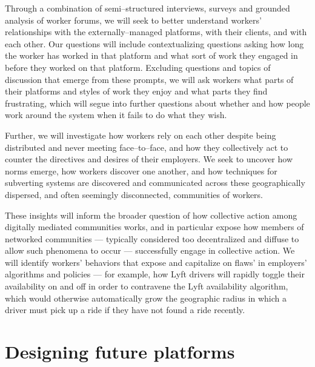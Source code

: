 \documentclass[11pt]{article}
\begin{document}
Through a combination of semi--structured interviews,
surveys and grounded analysis of worker forums,
we will seek to better understand workers' relationships with the externally--managed platforms,
with their clients,
and with each other.
Our questions will include contextualizing questions asking how long the worker has worked in that platform and what sort of work they engaged in before they worked on that platform.
Excluding questions and topics of discussion that emerge from these prompts,
we will ask workers what parts of their platforms and styles of work they enjoy and what parts they find frustrating,
which will segue into further questions about whether and how people work around the system when it fails to do what they wish.

Further,
we will investigate how workers rely on each other despite being distributed and never meeting face--to--face,
and how they collectively act to counter the directives and desires of their employers.
We seek to uncover how norms emerge, how workers discover one another, and how techniques for subverting systems are discovered and communicated across these geographically dispersed, and often seemingly disconnected, communities of workers.

These insights will inform the broader question of how collective action among digitally mediated communities works, and in particular expose how members of networked communities 
--- typically considered too decentralized and diffuse to allow such phenomena to occur ---
successfully engage in collective action.
We will identify workers' behaviors that expose and capitalize on flaws' in employers' algorithms and policies 
--- for example, how Lyft drivers will rapidly toggle their availability on and off in order to contravene the Lyft availability algorithm, which would otherwise automatically grow the geographic radius in which a driver must pick up a ride if they have not found a ride recently.


\section{Designing future platforms}
\end{document}

